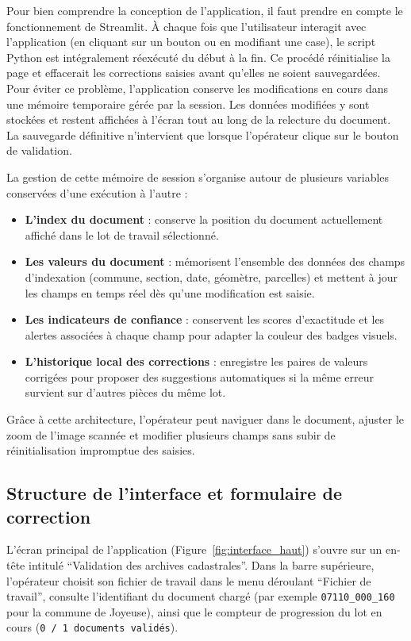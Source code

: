 Pour bien comprendre la conception de l'application, il faut prendre en compte le fonctionnement de Streamlit. À chaque fois que l'utilisateur interagit avec l'application (en cliquant sur un bouton ou en modifiant une case), le script Python est intégralement réexécuté du début à la fin. Ce procédé réinitialise la page et effacerait les corrections saisies avant qu'elles ne soient sauvegardées. Pour éviter ce problème, l'application conserve les modifications en cours dans une mémoire temporaire gérée par la session. Les données modifiées y sont stockées et restent affichées à l'écran tout au long de la relecture du document. La sauvegarde définitive n'intervient que lorsque l'opérateur clique sur le bouton de validation.

La gestion de cette mémoire de session s'organise autour de plusieurs variables conservées d'une exécution à l'autre :
\begin{itemize}
  \item \textbf{L'index du document} : conserve la position du document actuellement affiché dans le lot de travail sélectionné.
  \item \textbf{Les valeurs du document} : mémorisent l'ensemble des données des champs d'indexation (commune, section, date, géomètre, parcelles) et mettent à jour les champs en temps réel dès qu'une modification est saisie.
  \item \textbf{Les indicateurs de confiance} : conservent les scores d'exactitude et les alertes associées à chaque champ pour adapter la couleur des badges visuels.
  \item \textbf{L'historique local des corrections} : enregistre les paires de valeurs corrigées pour proposer des suggestions automatiques si la même erreur survient sur d'autres pièces du même lot.
\end{itemize}

Grâce à cette architecture, l'opérateur peut naviguer dans le document, ajuster le zoom de l'image scannée et modifier plusieurs champs sans subir de réinitialisation impromptue des saisies.





\subsection{Structure de l'interface et formulaire de correction}

L'écran principal de l'application (Figure~\ref{fig:interface_haut}) s'ouvre sur un en-tête intitulé \enquote{Validation des archives cadastrales}. Dans la barre supérieure, l'opérateur choisit son fichier de travail dans le menu déroulant \enquote{Fichier de travail}, consulte l'identifiant du document chargé (par exemple \texttt{07110\_000\_160} pour la commune de Joyeuse), ainsi que le compteur de progression du lot en cours (\texttt{0 / 1 documents validés}).

